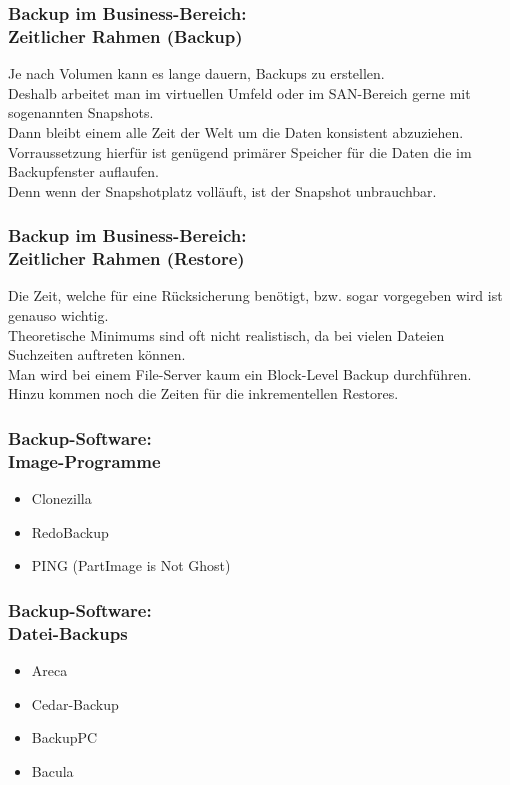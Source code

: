 \begin{frame}
  \frametitle{Backup im Business-Bereich:\\Zeitlicher Rahmen (Backup)}
  \pause
  Je nach Volumen kann es lange dauern, Backups zu erstellen.\\
  \pause
  Deshalb arbeitet man im virtuellen Umfeld oder im SAN-Bereich gerne mit sogenannten Snapshots.\\
  \pause
  Dann bleibt einem alle Zeit der Welt um die Daten konsistent abzuziehen.\\
  \pause
  Vorraussetzung hierfür ist genügend primärer Speicher für die Daten die im Backupfenster auflaufen.\\
  \pause
  Denn wenn der Snapshotplatz volläuft, ist der Snapshot unbrauchbar.
\end{frame}

\begin{frame}
  \frametitle{Backup im Business-Bereich:\\Zeitlicher Rahmen (Restore)}
  \pause
  Die Zeit, welche für eine Rücksicherung benötigt, bzw. sogar vorgegeben wird ist genauso wichtig.\\
  \pause
  Theoretische Minimums sind oft nicht realistisch, da bei vielen Dateien Suchzeiten auftreten können.\\
  \pause
  Man wird bei einem File-Server kaum ein Block-Level Backup durchführen.\\
  \pause
  Hinzu kommen noch die Zeiten für die inkrementellen Restores.
\end{frame}

\begin{frame}
  \frametitle{Backup-Software:\\Image-Programme}
  \pause
  \begin{itemize}
    \item Clonezilla
    \item RedoBackup
    \item PING (PartImage is Not Ghost)
  \end{itemize}
\end{frame}

\begin{frame}
  \frametitle{Backup-Software:\\Datei-Backups}
  \pause
  \begin{itemize}
    \item Areca
    \item Cedar-Backup
    \item BackupPC
    \item Bacula
  \end{itemize}
\end{frame}

